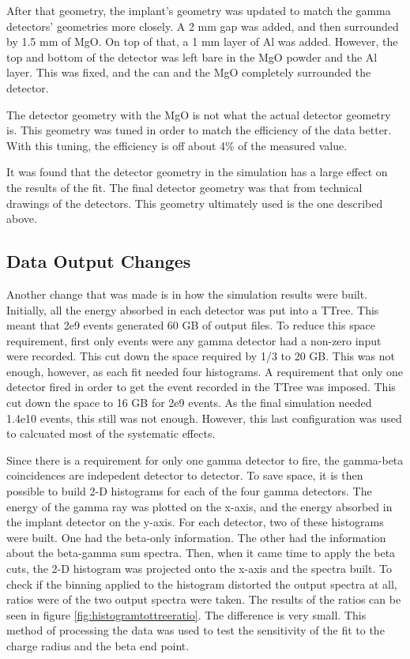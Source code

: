 \documentclass[../MaxHughesThesis.tex]{subfiles}
\begin{document}
After that geometry, the implant's geometry was updated to match the gamma detectors' geometries more closely.
A 2 mm gap was added, and then surrounded by 1.5 mm of MgO. 
On top of that, a 1 mm layer of Al was added.
However, the top and bottom of the detector was left bare in the MgO powder and the Al layer.
This was fixed, and the can and the MgO completely surrounded the detector.

The detector geometry with the MgO is not what the actual detector geometry is.
This geometry was tuned in order to match the efficiency of the data better.
With this tuning, the efficiency is off about 4\% of the measured value. 

It was found that the detector geometry in the simulation has a large effect on the results of the fit.
The final detector geometry was that from technical drawings of the detectors.
This geometry ultimately used  is the one described above. 

\subsection{Data Output Changes}
Another change that was made is in how the simulation results were built.
Initially, all the energy absorbed in each detector was put into a TTree.
This meant that 2e9 events generated 60 GB of output files.
To reduce this space requirement, first only events were any gamma detector had a non-zero input were recorded.
This cut down the space required by 1/3 to 20 GB.
This was not enough, however, as each fit needed four histograms.
A requirement that only one detector fired in order to get the event recorded in the TTree was imposed. 
This cut down the space to 16 GB for 2e9 events.
As the final simulation needed 1.4e10 events, this still was not enough.
However, this last configuration was used to calcuated most of the systematic effects.

Since there is a requirement for only one gamma detector to fire, the gamma-beta coincidences are indepedent detector to detector.
To save space, it is then possible to build 2-D histograms for each of the four gamma detectors.
The energy of the gamma ray was plotted on the x-axis, and the energy absorbed in the implant detector on the y-axis. 
For each detector, two of these histograms were built.
One had the beta-only information.
The other had the information about the beta-gamma sum spectra.
Then, when it came time to apply the beta cuts, the 2-D histogram was projected onto the x-axis and the spectra built.
To check if the binning applied to the histogram distorted the output spectra at all, ratios were of the two output spectra were taken.
The results of the ratios can be seen in figure \ref{fig:histogramtottreeratio}.
The difference is very small.
This method of processing the data was used to test the sensitivity of the fit to the charge radius and the beta end point.
\end{document}
